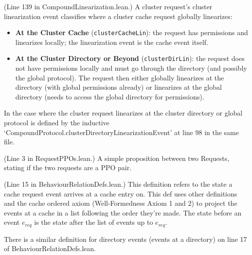 \begin{definition}
  \label{def:ClusterRequestLinearizationEvent}
  \leanok
  (Line 139 in CompoundLinearization.lean.)
  A cluster request's cluster linearization event classifies where a cluster cache request
  globally linearizes:
  \begin{itemize}
    \item \textbf{At the Cluster Cache} (\texttt{clusterCacheLin}): the request has permissions and
      linearizes locally; the linearization event is the cache event itself.
    \item \textbf{At the Cluster Directory or Beyond} (\texttt{clusterDirLin}): the request does not
      have permissions locally and must go through the directory (and possibly
      the global protocol). The request then either globally linearizes at the directory
      (with global permissions already) or linearizes at the global directory (needs
      to access the global directory for permissions).
  \end{itemize}
  In the case where the cluster request linearizes at the cluster directory or global protocol
  is defined by the inductive `CompoundProtocol.clusterDirectoryLinearizationEvent' at line 98
  in the same file.
\end{definition}

\begin{definition}
  \label{def:request-ppos}
  \leanok
  (Line 3 in RequestPPOs.lean.)
  A simple proposition between two Requests, stating
  if the two requests are a PPO pair.
\end{definition}

\begin{definition}
  \label{def:state-req-made-on}
  \leanok
  (Line 15 in BehaviourRelationDefs.lean.)
  This definition refers to the state a cache request event arrives at a cache
  entry on.
  This def uses other definitions and the cache ordered axiom (Well-Formedness Axiom 1
  and 2)
  to project the events at a cache in a list following the order they're made.
  The state before an event $e_{req}$ is the state after the list of events up to
  $e_{req}$.

  There is a similar definition for directory events (events at a directory) on
  line 17 of BehaviourRelationDefs.lean.
\end{definition}

